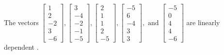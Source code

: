 \begin{exercise}
\begin{exerciseStatement}
  \end{exerciseStatement}
  \begin{exerciseAnswer}
   The vectors \(\left[\begin{array}{r}
1 \\
2 \\
-2 \\
3 \\
-6
\end{array}\right] , \left[\begin{array}{r}
3 \\
-4 \\
-2 \\
-1 \\
-5
\end{array}\right] , \left[\begin{array}{r}
2 \\
1 \\
1 \\
2 \\
-5
\end{array}\right] , \left[\begin{array}{r}
-5 \\
6 \\
-4 \\
3 \\
3
\end{array}\right] , \text{ and } \left[\begin{array}{r}
-5 \\
0 \\
4 \\
4 \\
-6
\end{array}\right]\) are 
  	 linearly dependent  .
  


  \end{exerciseAnswer}
\end{exercise}